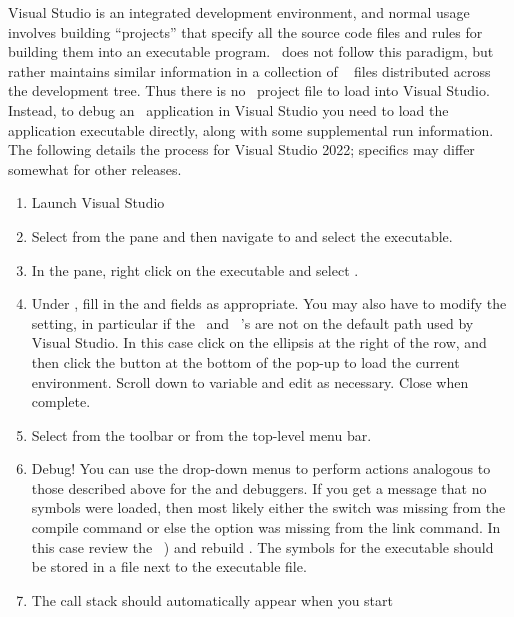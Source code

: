 Visual Studio is an integrated development environment, and normal usage
involves building ``projects'' that specify all the source code files
and rules for building them into an executable program. \OOMMF\ does not
follow this paradigm, but rather maintains similar information in a
collection of \Tcl\  files distributed across the
development tree. Thus there is no \OOMMF\ project file to load into
Visual Studio. Instead, to debug an \OOMMF\ application in Visual Studio
you need to load the application executable directly, along with some
supplemental run information. The following details the process for
Visual Studio 2022; specifics may differ somewhat for other releases.
\begin{enumerate}
\item Launch Visual Studio
\item Select  from the  pane and then navigate to and select the executable.
\item In the  pane, right click on the executable
  and select .
\item Under , fill in the  and  fields as appropriate. You may also have to modify the
   setting, in particular if the \Tcl\ and
  \Tk\ 's are not on the default path used by Visual
  Studio. In this case click on the ellipsis at the right of the
   row, and then click the  button at the
  bottom of the  pop-up to load the current
  environment. Scroll down to variable  and edit as necessary.
  Close when complete.
\item Select  from the toolbar or 
  from the top-level menu bar.
\item Debug! You can use the drop-down menus to perform actions
  analogous to those described above for the  and 
  debuggers. If you get a message that no symbols were loaded, then most
  likely either the  switch was missing from the compile command
  or else the  option was missing from the link command. In
  this case review the \OOMMF\ ) and rebuild \OOMMF.  The symbols 
  for the executable should be stored in a  file next to the
  executable file.
\item The call stack should automatically appear when you start

\end{enumerate}
